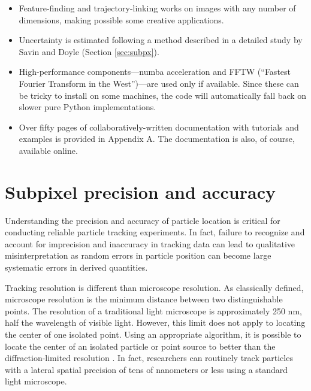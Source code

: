 \begin{itemize}
\item Feature-finding and trajectory-linking works on images with any number of dimensions, making possible some creative applications.

\item Uncertainty is estimated following a method described in a detailed study by Savin and Doyle\cite{Savin2005} (Section \ref{sec:subpx}).

\item High-performance components---numba acceleration and FFTW (``Fastest Fourier Transform in the West'')---are used only if available. Since these can be tricky to install on some machines, the code will automatically fall back on slower pure Python implementations.

\item Over fifty pages of collaboratively-written documentation with tutorials and examples is provided in Appendix A. The documentation is also, of course, available online.\cite{trackpy}

\end{itemize}


\section{\label{sec:subpx}Subpixel precision and accuracy}

Understanding the precision and accuracy of particle location is critical for conducting reliable particle tracking experiments. In fact, failure to recognize and account for imprecision and inaccuracy in tracking data can lead to qualitative misinterpretation\cite{Deschout2014,Parthasarathy2012} as random errors in particle position can become large systematic errors in derived quantities.

Tracking resolution is different than microscope resolution. As classically defined, microscope resolution is the minimum distance between two distinguishable points. The resolution of a traditional light microscope is approximately 250 nm, half the wavelength of visible light\cite{Thompson2002}. However, this limit does not apply to locating the center of one isolated point. Using an appropriate algorithm, it is possible to locate the center of an isolated particle or point source to better than the diffraction-limited resolution \cite{Bobroff1986,Deschout2014}. In fact, researchers can routinely track particles with a lateral spatial precision of tens of nanometers or less using a standard light microscope\cite{Crocker2007}.


